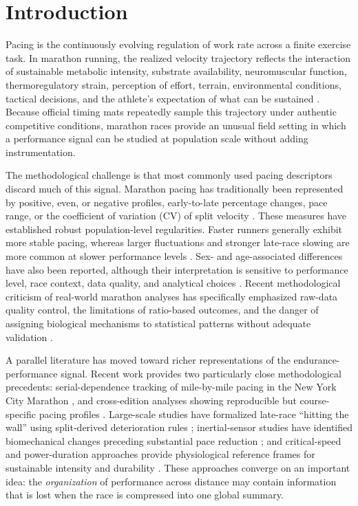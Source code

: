 \documentclass[pdflatex,sn-basic]{sn-jnl}
\begin{document}
\section{Introduction}

Pacing is the continuously evolving regulation of work rate across a finite exercise task. In marathon running, the realized velocity trajectory reflects the interaction of sustainable metabolic intensity, substrate availability, neuromuscular function, thermoregulatory strain, perception of effort, terrain, environmental conditions, tactical decisions, and the athlete's expectation of what can be sustained \citep{Abbiss2008,Renfree2018,Azevedo2021}. Because official timing mats repeatedly sample this trajectory under authentic competitive conditions, marathon races provide an unusual field setting in which a performance signal can be studied at population scale without adding instrumentation.

The methodological challenge is that most commonly used pacing descriptors discard much of this signal. Marathon pacing has traditionally been represented by positive, even, or negative profiles, early-to-late percentage changes, pace range, or the coefficient of variation (CV) of split velocity \citep{Sha2024}. These measures have established robust population-level regularities. Faster runners generally exhibit more stable pacing, whereas larger fluctuations and stronger late-race slowing are more common at slower performance levels \citep{Sha2024,Dong2026}. Sex- and age-associated differences have also been reported, although their interpretation is sensitive to performance level, race context, data quality, and analytical choices . Recent methodological criticism of real-world marathon analyses has specifically emphasized raw-data quality control, the limitations of ratio-based outcomes, and the danger of assigning biological mechanisms to statistical patterns without adequate validation .

A parallel literature has moved toward richer representations of the endurance-performance signal. Recent work provides two particularly close methodological precedents: serial-dependence tracking of mile-by-mile pacing in the New York City Marathon \citep{Thuany2025}, and cross-edition analyses showing reproducible but course-specific pacing profiles \citep{Oficial2021,Oficial2022}. Large-scale studies have formalized late-race ``hitting the wall'' using split-derived deterioration rules \citep{Doherty2020}; inertial-sensor studies have identified biomechanical changes preceding substantial pace reduction \citep{Meyer2021,Miyazaki2025}; and critical-speed and power-duration approaches provide physiological reference frames for sustainable intensity and durability \citep{SmythMuniz2020,Drake2024,WahlJi2026}. These approaches converge on an important idea: the \emph{organization} of performance across distance may contain information that is lost when the race is compressed into one global summary.
\end{document}
